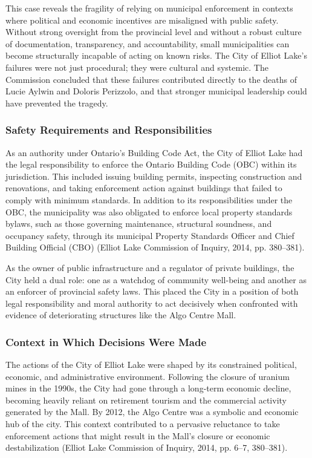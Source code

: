 \documentclass[12pt]{article}
\begin{document}
This case reveals the fragility of relying on municipal enforcement in contexts where political and economic incentives are misaligned with public safety. Without strong oversight from the provincial level and without a robust culture of documentation, transparency, and accountability, small municipalities can become structurally incapable of acting on known risks. The City of Elliot Lake’s failures were not just procedural; they were cultural and systemic. The Commission concluded that these failures contributed directly to the deaths of Lucie Aylwin and Doloris Perizzolo, and that stronger municipal leadership could have prevented the tragedy.

\subsubsection*{Safety Requirements and Responsibilities}
As an authority under Ontario’s Building Code Act, the City of Elliot Lake had the legal responsibility to enforce the Ontario Building Code (OBC) within its jurisdiction. This included issuing building permits, inspecting construction and renovations, and taking enforcement action against buildings that failed to comply with minimum standards. In addition to its responsibilities under the OBC, the municipality was also obligated to enforce local property standards bylaws, such as those governing maintenance, structural soundness, and occupancy safety, through its municipal Property Standards Officer and Chief Building Official (CBO) (Elliot Lake Commission of Inquiry, 2014, pp. 380–381).

As the owner of public infrastructure and a regulator of private buildings, the City held a dual role: one as a watchdog of community well-being and another as an enforcer of provincial safety laws. This placed the City in a position of both legal responsibility and moral authority to act decisively when confronted with evidence of deteriorating structures like the Algo Centre Mall.

\subsubsection*{Context in Which Decisions Were Made}
The actions of the City of Elliot Lake were shaped by its constrained political, economic, and administrative environment. Following the closure of uranium mines in the 1990s, the City had gone through a long-term economic decline, becoming heavily reliant on retirement tourism and the commercial activity generated by the Mall. By 2012, the Algo Centre was a symbolic and economic hub of the city. This context contributed to a pervasive reluctance to take enforcement actions that might result in the Mall’s closure or economic destabilization (Elliot Lake Commission of Inquiry, 2014, pp. 6–7, 380–381).
\end{document}
